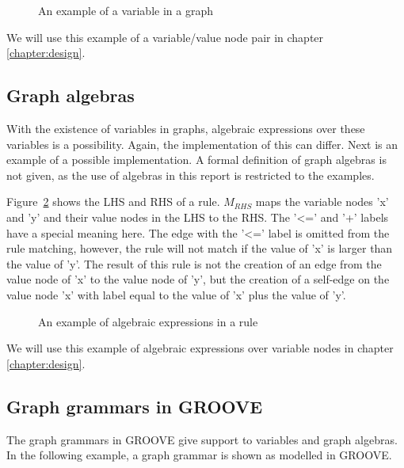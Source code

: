 \begin{figure}[ht]
  \begin{center}
    
  \end{center}
  \caption{An example of a variable in a graph}
  \label{fig:variable_node}
\end{figure}

We will use this example of a variable/value node pair in chapter \ref{chapter:design}.

\subsection{Graph algebras}
With the existence of variables in graphs, algebraic expressions over these variables is a possibility. Again, the implementation of this can differ. Next is an example of a possible implementation. A formal definition of graph algebras is not given, as the use of algebras in this report is restricted to the examples.

Figure~\ref{fig:algebra} shows the LHS and RHS of a rule. $\mathit{M_{RHS}}$ maps the variable nodes 'x' and 'y' and their value nodes in the LHS to the RHS. The '<=' and '+' labels have a special meaning here. The edge with the '<=' label is omitted from the rule matching, however, the rule will not match if the value of 'x' is larger than the value of 'y'. The result of this rule is not the creation of an edge from the value node of 'x' to the value node of 'y', but the creation of a self-edge on the value node 'x' with label equal to the value of 'x' plus the value of 'y'.  

\begin{figure}[ht]
  \begin{center}
    \hspace{20px}
  \end{center}
  \caption{An example of algebraic expressions in a rule}
  \label{fig:algebra}
\end{figure}

We will use this example of algebraic expressions over variable nodes in chapter \ref{chapter:design}.

\subsection{Graph grammars in GROOVE}\label{sec:example_groove}
The graph grammars in GROOVE give support to variables and graph algebras. In the following example, a graph grammar is shown as modelled in GROOVE. 

